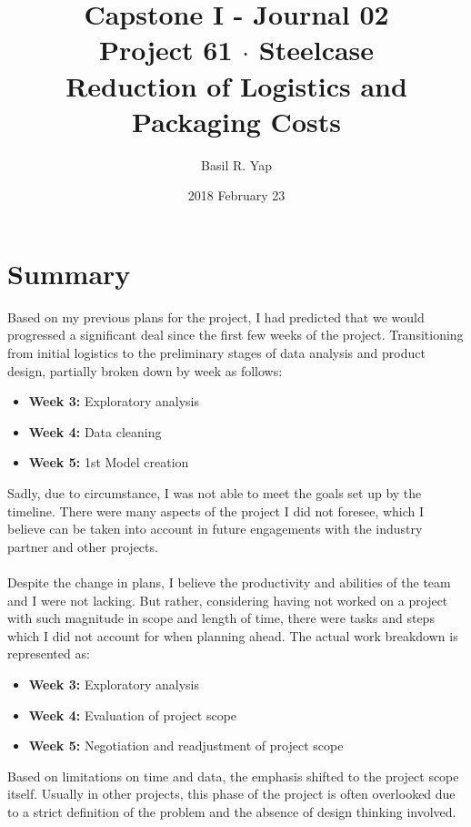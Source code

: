 \documentclass[a4paper, fleqn]{article}
\begin{document}
\title{Capstone I - Journal 02 \\ Project 61 $\cdot$  Steelcase \\ Reduction of Logistics and Packaging Costs}
\author{Basil R. Yap}
\date{2018 February 23}
\maketitle

\section{Summary}

Based on my previous plans for the project, I had predicted that we would progressed a significant deal since the first few weeks of the project. Transitioning from initial logistics to the preliminary stages of data analysis and product design, partially broken down by week as follows:\begin{itemize}
\item \textbf{Week 3:} Exploratory analysis
\item \textbf{Week 4:} Data cleaning
\item \textbf{Week 5:} 1st Model creation
\end{itemize}
Sadly, due to circumstance, I was not able to meet the goals set up by the timeline. There were many aspects of the project I did not foresee, which I believe can be taken into account in future engagements with the industry partner and other projects.  \\
\vspace{1pt}\\
Despite the change in plans, I believe the productivity and abilities of the team and I were not lacking. But rather, considering having not worked on a project with such magnitude in scope and length of time, there were tasks and steps which I did not account for when planning ahead. The actual work breakdown is represented as:\begin{itemize}
\item \textbf{Week 3:} Exploratory analysis
\item \textbf{Week 4:} Evaluation of project scope
\item \textbf{Week 5:} Negotiation and readjustment of project scope
\end{itemize}
Based on limitations on time and data, the emphasis shifted to the project scope itself. Usually in other projects, this phase of the project is often overlooked due to a strict definition of the problem and the absence of design thinking involved.
\end{document}
